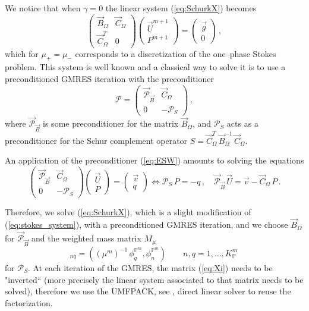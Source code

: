 \documentclass[a4paper,12pt,onecolumn]{article}
\newcommand{\pspace}{\mathbb{P}}
\begin{document}
We notice that when $\gamma = 0$ the linear system (\ref{eq:SchurkX}) becomes
\begin{equation} \label{eq:stokes_system}
\begin{pmatrix}
\vec B_\Omega & \vec C_\Omega \\
\vec C_\Omega^T & 0
\end{pmatrix}
\begin{pmatrix}
\vec U^{m+1} \\ P^{m+1}
\end{pmatrix}
= \begin{pmatrix}
\vec g \\
0
\end{pmatrix}\,,
\end{equation}
which for $\mu_+=\mu_-$ corresponds to a discretization of the one--phase
Stokes problem. This system is well known and a classical way to solve it is to
use a preconditioned GMRES iteration with the preconditioner
\begin{equation} \label{eq:ESW}
\mathcal{P} = \begin{pmatrix}
\vec{\mathcal{P}}_{\vec B} & \vec C_\Omega \\
0 & -\mathcal{P}_S
\end{pmatrix}\,,
\end{equation}
where $\vec{\mathcal{P}}_{\vec B}$ is some preconditioner for the matrix $\vec
B_\Omega$, and $\mathcal{P}_S$ acts as a preconditioner for the Schur complement
operator $S=\vec C^T_\Omega \,\vec B_\Omega^{-1}\,\vec C_\Omega$.

An application of the preconditioner (\ref{eq:ESW}) amounts to solving the
equations
\begin{equation*}
\begin{pmatrix}
\vec{\mathcal{P}}_{\vec B} & \vec C_\Omega \\
0 & -\mathcal{P}_S
\end{pmatrix}
\begin{pmatrix} \vec U \\ P \end{pmatrix}
= \begin{pmatrix} \vec v \\ q \end{pmatrix}
\iff
\mathcal{P}_S\,P = -q\,,\quad \vec{\mathcal{P}}_{\vec B}\,\vec U = \vec v -
\vec C_\Omega\,P\,.
\end{equation*}

Therefore, we solve (\ref{eq:SchurkX}), which is a slight modification of
(\ref{eq:stokes_system}), with a preconditioned GMRES iteration, and we choose
$\vec B_\Omega$  for $\vec{\mathcal{P}}_{\vec B}$ and the weighted mass matrix $
M_\mu$
\begin{equation*}
[M_\mu]_{nq} = \left((\mu^m)^{-1}\,\phi_q^{\pspace^m},
\phi_n^{\pspace^m}\right) \qquad n,q = 1 ,\ldots, K_\pspace^m\,
\end{equation*}
for $\mathcal{P}_S$.
At each iteration of the GMRES, the matrix (\ref{eq:Xi}) needs to be
"inverted`` (more precisely the linear system associated to that matrix needs to
be solved), therefore we use the UMFPACK, see
\cite{UMFPACK,suitesparse-web-page}, direct linear solver to reuse the
factorization.
\end{document}
